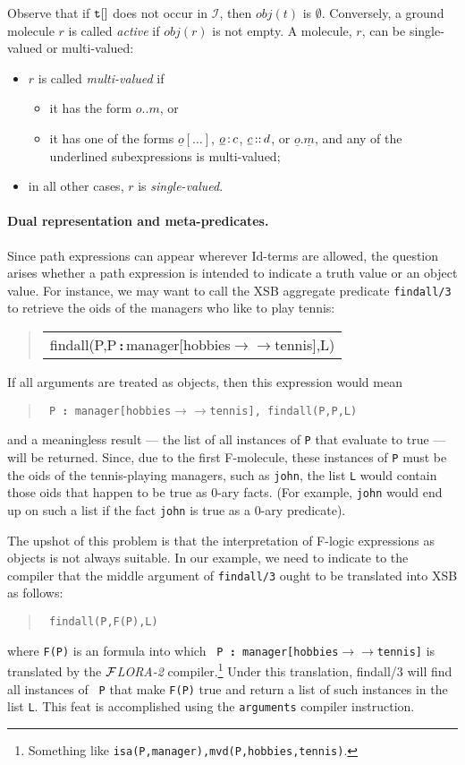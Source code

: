 \documentclass[11pt]{article}
\newenvironment{qrules}{\begin{quote}\tt\begin{tabular}[t]{l}}%
{\end{tabular}\end{quote}}
\newcommand{\obj}{\textit{obj}\xspace}
\newcommand{\db}[1]{\ensuremath{\mathcal{#1}}}
\newcommand{\isa}{\,{\bf{:}}\,}
\newcommand{\subcl}{\,{\bf{::}}\,}
\newcommand{\mvd}{\ensuremath{{\rightarrow\!\!\!\!\rightarrow}}}  %
\newcommand{\FLORA}{{\mbox{${\cal F}${\small\it LORA}\rm\emph{-2}}}\xspace}
\newcommand{\fl}{\mbox{F-logic}\xspace}
\begin{document}
Observe that if $\tt t[]$ does not occur in \db{I}, then $\obj(t)$ is
$\emptyset$.  Conversely, a ground molecule $r$ is called \emph{active} if
$\obj(r)$ is not empty. A molecule, $r$, can be 
single-valued or multi-valued:
\begin{itemize}
\item $r$ is called \emph{multi-valued} if
 \begin{itemize}
  \item it has the form $o..m$, or 
  \item it has one of the forms $\underline{o}[\dots]$,
    $\underline{o}\isa c$, $\underline{c}\subcl d$, or
    $\underline{o}.\underline{m}$, and any of the underlined
    subexpressions is multi-valued;
 \end{itemize}
\item in all other cases, $r$ is \emph{single-valued}.
\end{itemize}

\paragraph{Dual representation and meta-predicates.}
Since path expressions can appear wherever Id-terms are allowed, the
question arises whether a path expression is intended to indicate a truth
value or an object value. For instance, we may want to call the XSB
aggregate predicate {\tt findall/3} to retrieve the oids of the managers
who like to play tennis:
\begin{qrules}
findall(P,P{\isa}manager[hobbies{\mvd}tennis],L)
\end{qrules}
If all arguments are treated as objects, then this expression would mean
\begin{quote}
 \tt
 P{\isa}manager[hobbies{\mvd}tennis], findall(P,P,L)
\end{quote}
and a meaningless result --- the list of all instances of {\tt P} that
evaluate to true --- will be returned. Since, due to the first F-molecule,
these instances of {\tt P} must be the oids of the tennis-playing managers,
such as {\tt john}, the list {\tt L} would contain those oids that happen
to be true as 0-ary facts. (For example, {\tt john} would end up on such a
list if the fact {\tt john} is true as a 0-ary predicate).

The upshot of this problem is that the interpretation of \fl expressions as
objects is not always suitable. In our example, we need to indicate to the
compiler that the middle argument of {\tt findall/3} ought to be translated
into XSB as follows:
\begin{quote}
 \tt
 findall(P,F(P),L)
\end{quote}
where {\tt F(P)} is an formula into which {\tt
  P{\isa}manager[hobbies{\mvd}tennis]} is translated by the \FLORA
compiler.\footnote{
  Something like {\tt isa(P,manager),mvd(P,hobbies,tennis)}.
  }
Under this translation, findall/3 will find all instances of {\tt
  P} that make {\tt F(P)} true and return a list of such instances in the
list {\tt L}. This feat is accomplished using the {\tt arguments} compiler
instruction.
\end{document}
